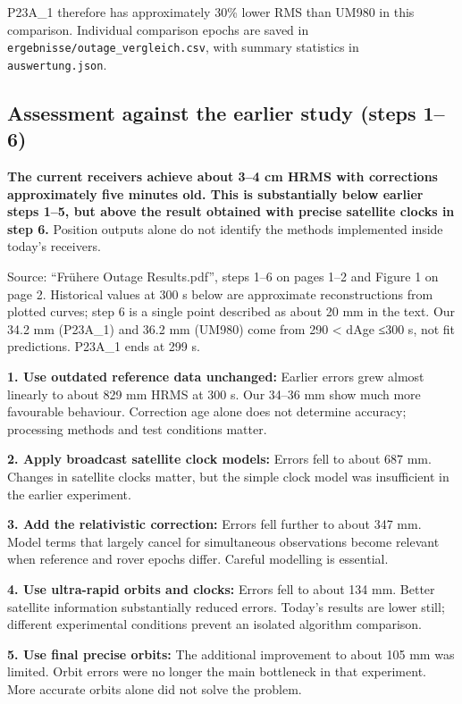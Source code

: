 \documentclass[11pt,a4paper]{article}
\begin{document}
P23A\_1 therefore has approximately 30\% lower RMS than UM980 in this comparison. Individual comparison epochs are saved in {\small\texttt{ergebnisse/\allowbreak{}outage\_\allowbreak{}vergleich.csv}}, with summary statistics in {\small\texttt{auswertung.json}}.

\subsection{Assessment against the earlier study (steps 1–6)}

\textbf{The current receivers achieve about 3–4 cm HRMS with corrections approximately five minutes old. This is substantially below earlier steps 1–5, but above the result obtained with precise satellite clocks in step 6.} Position outputs alone do not identify the methods implemented inside today's receivers.

Source: “Frühere Outage Results.pdf”, steps 1–6 on pages 1–2 and Figure 1 on page 2. Historical values at 300 s below are approximate reconstructions from plotted curves; step 6 is a single point described as about 20 mm in the text. Our 34.2 mm (P23A\_1) and 36.2 mm (UM980) come from 290 < dAge ≤300 s, not fit predictions. P23A\_1 ends at 299 s.

\textbf{1. Use outdated reference data unchanged:} Earlier errors grew almost linearly to about 829 mm HRMS at 300 s. Our 34–36 mm show much more favourable behaviour. Correction age alone does not determine accuracy; processing methods and test conditions matter.

\textbf{2. Apply broadcast satellite clock models:} Errors fell to about 687 mm. Changes in satellite clocks matter, but the simple clock model was insufficient in the earlier experiment.

\textbf{3. Add the relativistic correction:} Errors fell further to about 347 mm. Model terms that largely cancel for simultaneous observations become relevant when reference and rover epochs differ. Careful modelling is essential.

\textbf{4. Use ultra-rapid orbits and clocks:} Errors fell to about 134 mm. Better satellite information substantially reduced errors. Today's results are lower still; different experimental conditions prevent an isolated algorithm comparison.

\textbf{5. Use final precise orbits:} The additional improvement to about 105 mm was limited. Orbit errors were no longer the main bottleneck in that experiment. More accurate orbits alone did not solve the problem.
\end{document}
